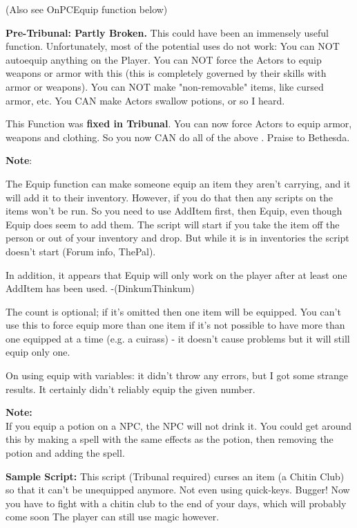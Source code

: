 \documentclass[
]{article}
\begin{document}
(Also see OnPCEquip function below)

\textbf{Pre-Tribunal: Partly Broken.} This could have been an immensely
useful function. Unfortunately, most of the potential uses do not work:
You can NOT autoequip anything on the Player. You can NOT force the
Actors to equip weapons or armor with this (this is completely governed
by their skills with armor or weapons). You can NOT make "non-removable"
items, like cursed armor, etc. You CAN make Actors swallow potions, or
so I heard.

This Function was \textbf{fixed in Tribunal}. You can now force Actors
to equip armor, weapons and clothing. So you now CAN do all of the above
. Praise to Bethesda.

\textbf{Note}:

The Equip function can make someone equip an item they aren't carrying,
and it will add it to their inventory. However, if you do that then any
scripts on the items won't be run. So you need to use AddItem first,
then Equip, even though Equip does seem to add them. The script will
start if you take the item off the person or out of your inventory and
drop. But while it is in inventories the script doesn't start (Forum
info, ThePal).

In addition, it appears that Equip will only work on the player after at
least one AddItem has been used. -(DinkumThinkum)

The count is optional; if it's omitted then one item will be equipped.
You can't use this to force equip more than one item if it's not
possible to have more than one equipped at a time (e.g. a cuirass) - it
doesn't cause problems but it will still equip only one.

On using equip with variables: it didn't throw any errors, but I got
some strange results. It certainly didn't reliably equip the given
number.

\textbf{Note:\\
}If you equip a potion on a NPC, the NPC will not drink it. You could
get around this by making a spell with the same effects as the potion,
then removing the potion and adding the spell.\textbf{\hfill\break
}

\textbf{Sample Script:} This script (Tribunal required) curses an item
(a Chitin Club) so that it can't be unequipped anymore. Not even using
quick-keys. Bugger! Now you have to fight with a chitin club to the end
of your days, which will probably come soon The player can still use
magic however.
\end{document}

